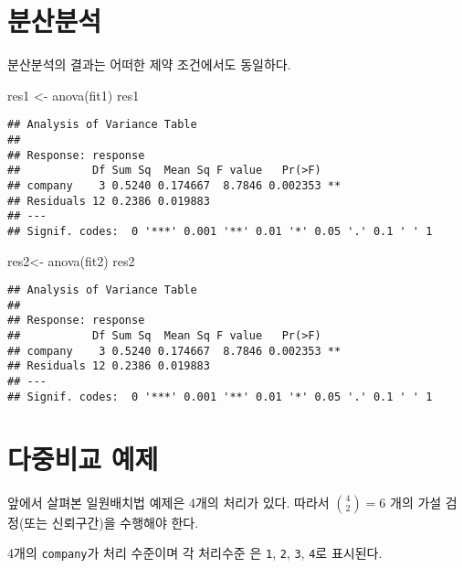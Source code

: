 \documentclass[
]{book}
\newenvironment{Shaded}{\begin{snugshade}}{\end{snugshade}}
\newcommand{\FunctionTok}[1]{\textcolor[rgb]{0.00,0.00,0.00}{#1}}
\newcommand{\NormalTok}[1]{#1}
\newcommand{\OtherTok}[1]{\textcolor[rgb]{0.56,0.35,0.01}{#1}}
\begin{document}
\hypertarget{uxbd84uxc0b0uxbd84uxc11d}{%
\section{분산분석}\label{uxbd84uxc0b0uxbd84uxc11d}}

분산분석의 결과는 어떠한 제약 조건에서도 동일하다.

\begin{Shaded}
\begin{Highlighting}[]
\NormalTok{res1 }\OtherTok{\textless{}{-}} \FunctionTok{anova}\NormalTok{(fit1)}
\NormalTok{res1}
\end{Highlighting}
\end{Shaded}

\begin{verbatim}
## Analysis of Variance Table
## 
## Response: response
##           Df Sum Sq  Mean Sq F value   Pr(>F)   
## company    3 0.5240 0.174667  8.7846 0.002353 **
## Residuals 12 0.2386 0.019883                    
## ---
## Signif. codes:  0 '***' 0.001 '**' 0.01 '*' 0.05 '.' 0.1 ' ' 1
\end{verbatim}

\begin{Shaded}
\begin{Highlighting}[]
\NormalTok{res2}\OtherTok{\textless{}{-}} \FunctionTok{anova}\NormalTok{(fit2)}
\NormalTok{res2}
\end{Highlighting}
\end{Shaded}

\begin{verbatim}
## Analysis of Variance Table
## 
## Response: response
##           Df Sum Sq  Mean Sq F value   Pr(>F)   
## company    3 0.5240 0.174667  8.7846 0.002353 **
## Residuals 12 0.2386 0.019883                    
## ---
## Signif. codes:  0 '***' 0.001 '**' 0.01 '*' 0.05 '.' 0.1 ' ' 1
\end{verbatim}

\hypertarget{uxb2e4uxc911uxbe44uxad50-uxc608uxc81c}{%
\section{다중비교 예제}\label{uxb2e4uxc911uxbe44uxad50-uxc608uxc81c}}

앞에서 살펴본 일원배치법 예제은 4개의 처리가 있다. 따라서 \({4 \choose 2} =6\)
개의 가설 검정(또는 신뢰구간)을 수행해야 한다.

4개의 \texttt{company}가 처리 수준이며 각 처리수준 은 \texttt{1}, \texttt{2}, \texttt{3}, \texttt{4}로 표시된다.
\end{document}

